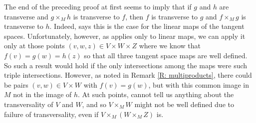 \begin{remark}
The end of the preceding proof at first seems to imply that if  $g$ and $h$ are transverse and $g\times_M h$ is transverse to $f$, then $f$ is transverse to $g$ and $f\times_Mg$ is transverse to $h$. Indeed,  \cite[Propositions~4-9]{RamBas09} says this is the case for the linear maps of the tangent spaces. Unfortunately, however, as \cite[Propositions~4-9]{RamBas09} applies only to linear maps, we can apply it only at those points $(v,w,z)\in V\times W\times Z$ where we know that $f(v)=g(w)=h(z)$ so that all three tangent space maps are well defined. So such a result would hold if the only intersections among the maps were such triple intersections. However, as noted in Remark \ref{R: multiproducts}, there could be pairs $(v,w)\in V\times W$ with $f(v)=g(w)$, but with this common image in $M$ not in the image of $h$. At such points, \cite[Propositions~4-9]{RamBas09} cannot tell us anything about the transversality of $V$ and $W$, and so $V\times_MW$ might not be well defined due to failure of transversality, even if $V\times_M (W\times_M Z)$ is. 
\end{remark}



